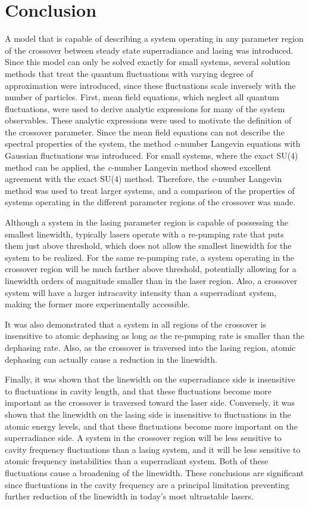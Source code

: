 \documentclass[aps,
twocolumn,
superscriptaddress,groupedaddress]{revtex4}
\begin{document}
\section{Conclusion}

A model that is capable of describing a system operating in any
parameter region of the crossover between steady state superradiance and
lasing was introduced. Since this model can only be solved exactly for small systems, several solution methods that treat the quantum fluctuations with varying degree of approximation were introduced, since these fluctuations scale inversely with the number of particles.  First, mean field equations, which neglect all quantum fluctuations, were used to derive analytic expressions for many of the system observables. These analytic expressions were used to motivate the definition of the crossover parameter. Since the mean field equations can not describe the spectral properties of the system, the method {\it c}-number Langevin equations with Gaussian fluctuations was introduced. For small systems, where the exact SU(4) method can be applied, the {\it c}-number Langevin method showed excellent agreement with the exact SU(4) method. Therefore, the {\it c}-number Langevin method was used to treat larger systems, and a comparison of the properties of systems operating in the different parameter regions of the crossover was made. 

Although a system in the lasing parameter region is capable of
possessing the smallest linewidth, typically lasers operate with a
re-pumping rate that puts them just above threshold, which does not
allow the smallest linewidth for the system to be realized. For the same
re-pumping rate, a system operating in the crossover region will be much
farther above threshold, potentially allowing for a linewidth orders of
magnitude smaller than in the laser region. Also, a crossover system
will have a larger intracavity intensity than a superradiant system,
making the former more experimentally accessible.

It was also demonstrated that a system in all regions of the crossover
is insensitive to atomic dephasing as long as the re-pumping rate is
smaller than the dephasing rate. Also, as the crossover is traversed
into the lasing region, atomic dephasing can actually cause a reduction
in the linewidth.

Finally, it was shown that the linewidth on the superradiance side is
insensitive to fluctuations in cavity length, and that these
fluctuations become more important as the crossover is traversed toward
the laser side. Conversely, it was shown that the linewidth on the
lasing side is insensitive to fluctuations in the atomic energy levels,
and that these fluctuations become more important on the superradiance
side. A system in the crossover region will be less sensitive to cavity
frequency fluctuations than a lasing system, and it will be less
sensitive to atomic frequency instabilities than a superradiant system.
Both of these fluctuations cause a broadening of the linewidth. These
conclusions are significant since fluctuations in the cavity frequency
are a principal limitation preventing further reduction of the linewidth
in today's most ultrastable lasers.
\end{document}
